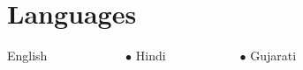 \section{{\textcolor{mainHeading}{Languages}}}
 \begin{itemize}[leftmargin=0.15in]
    \small{
    \item English  \ \ \ \ \ \ \ \ \ \ \ \
    $\bullet$ Hindi\ \ \ \ \ \ \ \ \ \ \ \
    $\bullet$ Gujarati

    }
 \end{itemize}